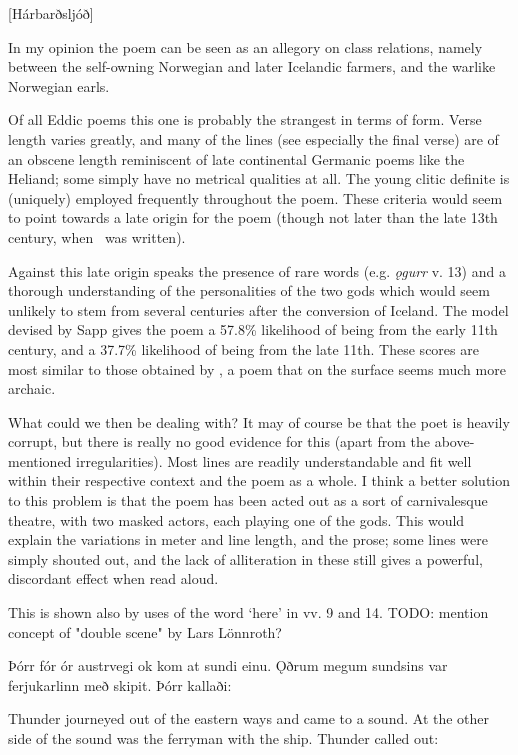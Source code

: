[Hárbarðsljóð]

In my opinion the poem can be seen as an allegory on class relations, namely between the self-owning Norwegian and later Icelandic farmers, and the warlike Norwegian earls.

Of all Eddic poems this one is probably the strangest in terms of form. Verse length varies greatly, and many of the lines (see especially the final verse) are of an obscene length reminiscent of late continental Germanic poems like the Heliand; some simply have no metrical qualities at all. The young clitic definite is (uniquely) employed frequently throughout the poem. These criteria would seem to point towards a late origin for the poem (though not later than the late 13th century, when \Regius\ was written).

Against this late origin speaks the presence of rare words (e.g. \emph{ǫgurr} v. 13) and a thorough understanding of the personalities of the two gods which would seem unlikely to stem from several centuries after the conversion of Iceland. The model devised by Sapp gives the poem a 57.8\% likelihood of being from the early 11th century, and a 37.7\% likelihood of being from the late 11th. These scores are most similar to those obtained by \Gripisspa, a poem that on the surface seems much more archaic.

What could we then be dealing with? It may of course be that the poet is heavily corrupt, but there is really no good evidence for this (apart from the above-mentioned irregularities). Most lines are readily understandable and fit well within their respective context and the poem as a whole. I think a better solution to this problem is that the poem has been acted out as a sort of carnivalesque theatre, with two masked actors, each playing one of the gods. This would explain the variations in meter and line length, and the prose; some lines were simply shouted out, and the lack of alliteration in these still gives a powerful, discordant effect when read aloud.

This is shown also by uses of the word ‘here’ in vv. 9 and 14. TODO: mention concept of "double scene" by Lars Lönnroth?


\sectionline


\bpg
\bpa Þórr fór ór austrvegi ok kom at sundi einu. Ǫðrum megum sundsins var ferjukarlinn með skipit. Þórr kallaði:\epa

\bpb Thunder journeyed out of the eastern ways and came to a sound. At the other side of the sound was the ferryman with the ship. Thunder called out:\epb
\epg


